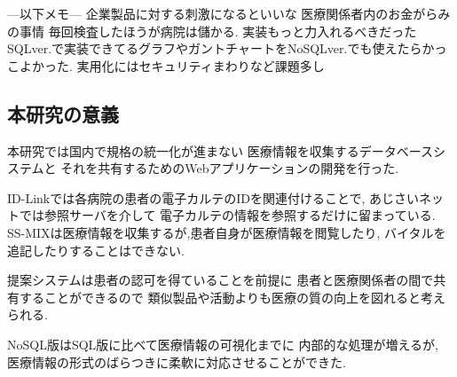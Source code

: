 
---以下メモ---
企業製品に対する刺激になるといいな
医療関係者内のお金がらみの事情
   毎回検査したほうが病院は儲かる.
実装もっと力入れるべきだった
    SQLver.で実装できてるグラフやガントチャートをNoSQLver.でも使えたらかっこよかった.
実用化にはセキュリティまわりなど課題多し
\fi

\subsection{本研究の意義}
  本研究では国内で規格の統一化が進まない
  医療情報を収集するデータベースシステムと
  それを共有するためのWebアプリケーションの開発を行った.


  ID-Linkでは各病院の患者の電子カルテのIDを関連付けることで,
  あじさいネットでは参照サーバを介して
  電子カルテの情報を参照するだけに留まっている.
  SS-MIXは医療情報を収集するが,患者自身が医療情報を閲覧したり,
  バイタルを追記したりすることはできない.

  提案システムは患者の認可を得ていることを前提に
  患者と医療関係者の間で共有することができるので
  類似製品や活動よりも医療の質の向上を図れると考えられる.

  NoSQL版はSQL版に比べて医療情報の可視化までに
  内部的な処理が増えるが,
  医療情報の形式のばらつきに柔軟に対応させることができた.


